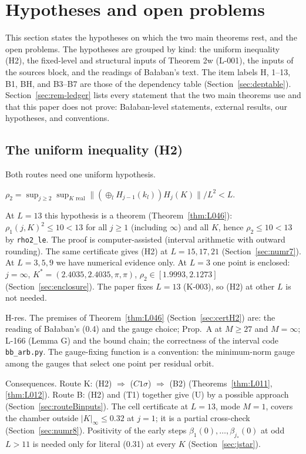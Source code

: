 \section{Hypotheses and open problems}\label{sec:remains}

This section states the hypotheses on which the two main theorems rest, and the open problems. The hypotheses are grouped by kind: the uniform inequality (H2), the fixed-level and structural inputs of Theorem 2w (L-001), the inputs of the sources block, and the readings of Ba{\l}aban's text. The item labels H, 1--13, B1, BH, and B3--B7 are those of the dependency table (Section~\ref{sec:deptable}). Section~\ref{sec:rem-ledger} lists every statement that the two main theorems use and that this paper does not prove: Ba{\l}aban-level statements, external results, our hypotheses, and conventions.

\subsection{The uniform inequality (H2)}\label{sec:rem-cert}

Both routes need one uniform hypothesis.
\begin{hypothesis}[item H; (H2), R-025]
$\rho_2=\sup_{j\ge2}\sup_{K\text{ real}}\|(\oplus_lH_{j-1}(k_l))H_j(K)\|/L^2<L$.
\end{hypothesis}
At $L=13$ this hypothesis is a theorem (Theorem~\ref{thm:L046}): $\rho_1(j,K)^2\le10<13$ for all $j\ge1$ (including $\infty$) and all $K$, hence $\rho_2\le10<13$ by \texttt{rho2\_le}. The proof is computer-assisted (interval arithmetic with outward rounding). The same certificate gives (H2) at $L=15,17,21$ (Section~\ref{sec:numr7}). At $L=3,5,9$ we have numerical evidence only. At $L=3$ one point is enclosed: $j=\infty$, $K^*=(2.4035,2.4035,\pi,\pi)$, $\rho_2\in[1.9993,2.1273]$ (Section~\ref{sec:enclosure}). The paper fixes $L=13$ (K-003), so (H2) at other $L$ is not needed.

H-res. The premises of Theorem~\ref{thm:L046} (Section~\ref{sec:certH2}) are: the reading of Ba{\l}aban's (0.4) and the gauge choice; Prop.\ A at $M\ge27$ and $M=\infty$; L-166 (Lemma G) and the bound chain; the correctness of the interval code \texttt{bb\_arb.py}. The gauge-fixing function is a convention: the minimum-norm gauge among the gauges that select one point per residual orbit.

Consequences. Route K: (H2) $\Rightarrow$ ($C1\sigma$) $\Rightarrow$ (B2) (Theorems~\ref{thm:L011}, \ref{thm:L012}). Route B: (H2) and (T1) together give (U) by a possible approach (Section~\ref{sec:routeBinputs}). The cell certificate at $L=13$, mode $M=1$, covers the chamber outside $|K|_\infty\le0.32$ at $j=1$; it is a partial cross-check (Section~\ref{sec:numr8}). Positivity of the early steps $\beta_1(0),\dots,\beta_{j_*}(0)$ at odd $L>11$ is needed only for literal (0.31) at every $K$ (Section~\ref{sec:jstar}).

